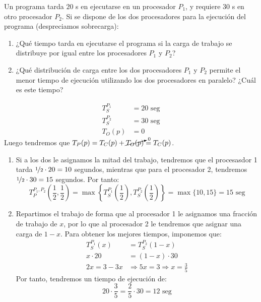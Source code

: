 \begin{ejercicio}
    Un programa tarda $20$ s en ejecutarse en un procesador $P_1$, y requiere $30$ s en otro procesador
    $P_2$. Si se dispone de los dos procesadores para la ejecución del programa (despreciamos sobrecarga):
    \begin{enumerate}
        \item ¿Qué tiempo tarda en ejecutarse el programa si la carga de trabajo se distribuye por igual entre los
        procesadores $P_1$ y $P_2$?
        \item ¿Qué distribución de carga entre los dos procesadores $P_1$ y $P_2$ permite el menor tiempo de
        ejecución utilizando los dos procesadores en paralelo? ¿Cuál es este tiempo?
    \end{enumerate}


    \begin{align*}
        T_S^{P_1} &= 20 \text{\ seg} \\
        T_S^{P_2} &= 30 \text{\ seg} \\
        T_O(p) &= 0
    \end{align*}
    Luego tendremos que $T_P(p) = T_C(p) + \cancelto{0}{T_O(p)} = T_C(p)$.

    \begin{enumerate}
        \item 
            Si a los dos le asignamos la mitad del trabajo, tendremos que el procesasdor 1 tarda $\nicefrac{1}{2}\cdot 20 = 10$ segundos, mientras que para el procesador 2, tendremos $\nicefrac{1}{2}\cdot 30 = 15$ segundos. Por tanto:
            \begin{equation*}
                T_P^{P_1, P_2}\left(\frac{1}{2}, \frac{1}{2}\right) = \max\left\{T_S^{P_1}\left(\frac{1}{2}\right), T_S^{P_2}\left(\frac{1}{2}\right)\right\} = \max\{10, 15\} = 15 \text{\ seg}
            \end{equation*}

        \item 
        Repartimos el trabajo de forma que al procesador 1 le asignamos una fracción de trabajo de $x$, por lo que al procesador 2 le tendremos que asignar una carga de $1-x$. Para obtener los mejores tiempos, imponemos que:
        \begin{align*}
            T_S^{P_1}(x) &= T_S^{P_2}(1-x) \\
            x\cdot 20 &= (1-x)\cdot 30 \\
            2x = 3-3x &\Longrightarrow 5x=3 \Longrightarrow x = \frac{3}{5}
        \end{align*}
        Por tanto, tendremos un tiempo de ejecución de:
        \begin{equation*}
            20\cdot \frac{3}{5} = \frac{2}{5}\cdot 30 = 12 \text{\ seg}
        \end{equation*}
    \end{enumerate}

    

\end{ejercicio}

